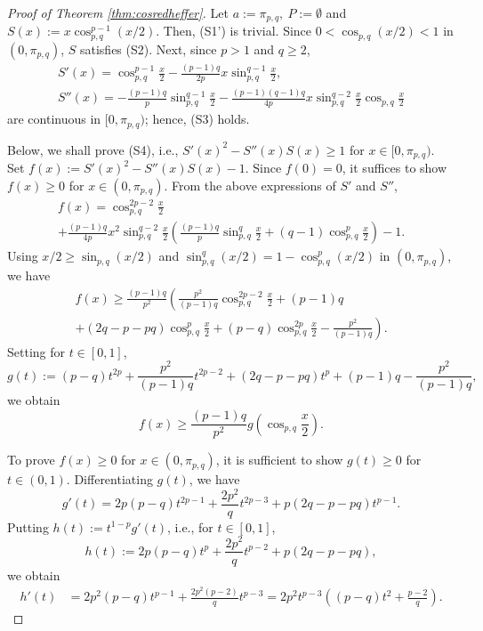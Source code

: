 \documentclass[12pt]{amsart}
\numberwithin{equation}{section}
\theoremstyle{plain}
\theoremstyle{definition}
\theoremstyle{remark}
\begin{document}
\begin{proof}[Proof of Theorem \ref{thm:cosredheffer}]
Let $a:=\pi_{p,q},\ P:=\emptyset$ and $S(x):=x\cos_{p,q}^{p-1}{(x/2)}$.
Then, (S1') is trivial. 
Since $0<\cos_{p,q}{(x/2)}<1$ in $(0,\pi_{p,q})$, 
$S$ satisfies (S2). Next, since $p>1$ and $q \geq 2$,
\begin{gather*}
S'(x)
=\cos_{p,q}^{p-1}\frac{x}{2}-\frac{(p-1)q}{2p}
x\sin_{p,q}^{q-1}\frac{x}{2},\\
S''(x)
=-\frac{(p-1)q}{p}\sin_{p,q}^{q-1}\frac{x}{2}
-\frac{(p-1)(q-1)q}{4p}x\sin_{p,q}^{q-2}\frac{x}{2}\cos_{p,q}\frac{x}{2}
\end{gather*}
are continuous in $[0,\pi_{p,q})$; hence, (S3) holds.

Below, we shall prove (S4), i.e., $S'(x)^2-S''(x)S(x) \geq 1$ for $x \in [0,\pi_{p,q})$. Set $f(x):=S'(x)^2-S''(x)S(x)-1$.
Since $f(0)=0$, it suffices to show $f(x) \geq 0$ for $x \in (0,\pi_{p,q})$. 
From the above expressions of $S'$ and $S''$,
\begin{multline*}
f(x)
=\cos_{p,q}^{2p-2}\frac{x}{2}\\
+\frac{(p-1)q}{4p}x^2\sin_{p,q}^{q-2}\frac{x}{2}
\left(\frac{(p-1)q}{p}\sin_{p,q}^q\frac{x}{2}
+(q-1)\cos_{p,q}^p\frac{x}{2}\right)-1.
\end{multline*}
Using $x/2 \geq \sin_{p,q}{(x/2)}$
and $\sin_{p,q}^q{(x/2)}=1-\cos_{p,q}^p{(x/2)}$
in $(0,\pi_{p,q})$,
we have
\begin{multline*}
f(x)
\geq \frac{(p-1)q}{p^2}
\left(\frac{p^2}{(p-1)q}\cos_{p,q}^{2p-2}\frac{x}{2}
+(p-1)q \right.\\
\left. +(2q-p-pq)\cos_{p,q}^p\frac{x}{2}
+(p-q)\cos_{p,q}^{2p}\frac{x}{2}
-\frac{p^2}{(p-1)q}\right).
\end{multline*}
Setting for $t \in [0,1]$,
\[g(t):=(p-q)t^{2p}+\frac{p^2}{(p-1)q}t^{2p-2}
+(2q-p-pq)t^p+(p-1)q-\frac{p^2}{(p-1)q},\]
we obtain
\[f(x) \geq \frac{(p-1)q}{p^2}g\left(\cos_{p,q}\frac{x}{2}\right).\]

To prove $f(x) \geq 0$ for $x \in (0,\pi_{p,q})$, it is sufficient to show $g(t) \geq 0$ for $t \in (0,1)$.
Differentiating $g(t)$, we have
\[g'(t)
=2p(p-q)t^{2p-1}
+\frac{2p^2}{q}t^{2p-3}
+p(2q-p-pq)t^{p-1}.\]
Putting $h(t):=t^{1-p}g'(t)$, i.e., for $t \in [0,1]$,
\[h(t)
:=2p(p-q)t^p+\frac{2p^2}{q}t^{p-2}+p(2q-p-pq),\]
we obtain
\begin{align*}
h'(t)
&=2p^2(p-q)t^{p-1}+\frac{2p^2(p-2)}{q}t^{p-3}
=2p^2t^{p-3}\left((p-q)t^2+\frac{p-2}{q}\right).
\end{align*}


\end{proof}
\end{document}
